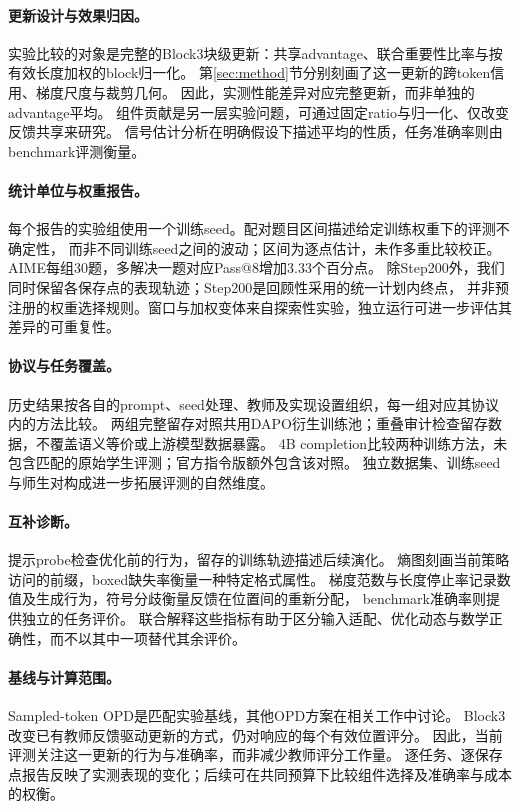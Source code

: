 \paragraph{更新设计与效果归因。}
实验比较的对象是完整的Block3块级更新：共享advantage、联合重要性比率与按有效长度加权的block归一化。
第\ref{sec:method}节分别刻画了这一更新的跨token信用、梯度尺度与裁剪几何。
因此，实测性能差异对应完整更新，而非单独的advantage平均。
组件贡献是另一层实验问题，可通过固定ratio与归一化、仅改变反馈共享来研究。
信号估计分析在明确假设下描述平均的性质，任务准确率则由benchmark评测衡量。

\paragraph{统计单位与权重报告。}
每个报告的实验组使用一个训练seed。配对题目区间描述给定训练权重下的评测不确定性，
而非不同训练seed之间的波动；区间为逐点估计，未作多重比较校正。
AIME每组30题，多解决一题对应Pass@8增加3.33个百分点。
除Step200外，我们同时保留各保存点的表现轨迹；Step200是回顾性采用的统一计划内终点，
并非预注册的权重选择规则。窗口与加权变体来自探索性实验，独立运行可进一步评估其差异的可重复性。

\paragraph{协议与任务覆盖。}
历史结果按各自的prompt、seed处理、教师及实现设置组织，每一组对应其协议内的方法比较。
两组完整留存对照共用DAPO衍生训练池；重叠审计检查留存数据，不覆盖语义等价或上游模型数据暴露。
4B completion比较两种训练方法，未包含匹配的原始学生评测；官方指令版额外包含该对照。
独立数据集、训练seed与师生对构成进一步拓展评测的自然维度。

\paragraph{互补诊断。}
提示probe检查优化前的行为，留存的训练轨迹描述后续演化。
熵图刻画当前策略访问的前缀，boxed缺失率衡量一种特定格式属性。
梯度范数与长度停止率记录数值及生成行为，符号分歧衡量反馈在位置间的重新分配，
benchmark准确率则提供独立的任务评价。
联合解释这些指标有助于区分输入适配、优化动态与数学正确性，而不以其中一项替代其余评价。

\paragraph{基线与计算范围。}
Sampled-token OPD是匹配实验基线，其他OPD方案在相关工作中讨论。
Block3改变已有教师反馈驱动更新的方式，仍对响应的每个有效位置评分。
因此，当前评测关注这一更新的行为与准确率，而非减少教师评分工作量。
逐任务、逐保存点报告反映了实测表现的变化；后续可在共同预算下比较组件选择及准确率与成本的权衡。

